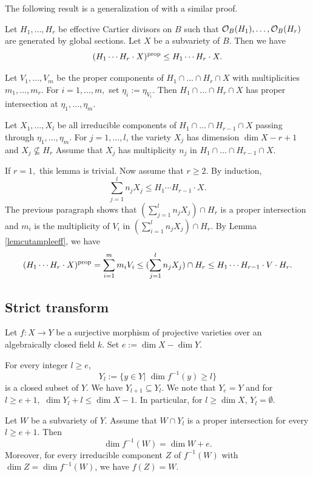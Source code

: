 \documentclass[12pt]{amsart}
\begin{document}
\medskip





The following result is a generalization of \cite[Lemma 3.3]{Jia2021} with a similar proof.

\begin{pro}\label{propropintboundhyp}
Let $H_1, \dots, H_r$ be effective Cartier divisors on $B$ such that 
${\mathcal O}_B(H_1),\dots,{\mathcal O}_B(H_r)$ are generated by global sections. 
Let $X$ be a subvariety of $B$.
Then we have 
$$(H_1\cdots H_r\cdot X)^{{\rm prop}}\leq H_1\cdots H_r\cdot X.$$
\end{pro}

\proof 
Let $V_1,\dots, V_m$ be the proper components of $H_1\cap \dots \cap H_r\cap X$ with multiplicities $m_1,\dots,m_r.$
For $i=1,\dots,m,$ set $\eta_i:=\eta_{V_i}$. Then $H_1\cap \dots \cap H_r\cap X$ has proper intersection at $\eta_1,\dots, \eta_m.$

Let $X_1,\dots, X_l$ be all irreducible components of $H_1\cap\dots\cap H_{r-1}\cap X$ passing through $\eta_1,\dots, \eta_m.$
For  $j=1,\dots,l$, the variety $X_j$ has dimension $\dim X-r+1$ and $X_j\not\subseteq H_r$
Assume that $X_j$ has multiplicity $n_j$ in $H_1\cap\dots\cap H_{r-1}\cap X$.

If $r=1,$ this lemma is trivial.  Now assume that $r\geq 2$. 
By induction,
 $$\sum_{j=1}^l n_jX_j\leq H_1\cdots H_{r-1}\cdot X.$$
The previous paragraph shows that $(\sum_{j=1}^l n_jX_j)\cap H_r$ is a proper intersection and $m_i$ is the multiplicity of $V_i$ in $(\sum_{i=1}^l n_jX_j)\cap H_r.$
By Lemma \ref{lemcutampleeff}, we have 
$$(H_1\cdots H_r\cdot X)^{{\rm prop}}=\sum_{i=1}^m m_iV_i\leq (\sum_{j=1}^l n_jX_j)\cap H_r\leq H_1\cdots H_{r-1}\cdot V\cdot H_r.$$
\endproof


\subsection{Strict transform}
Let $f:X\to Y$ be a surjective morphism of projective varieties over an algebraically closed field $k.$ 
Set $e:=\dim X-\dim Y$.

For every integer $l\geq e$,   
$$Y_l:=\{y\in Y|\,\, \dim f^{-1}(y)\geq l\}$$ 
is a closed subset of $Y$. 
We have $Y_{l+1}\subseteq Y_l$.
We note that $Y_{e}=Y$ and for $l\geq e+1,$
$\dim Y_l+l\leq \dim X-1$. In particular, for $l\geq \dim X$, $Y_l=\emptyset.$


\begin{lem}\label{lempullbackproper}
Let $W$ be a subvariety of $Y$. 
Assume that $W\cap Y_l$ is a proper intersection for every $l\geq e+1$.
Then 
$$\dim f^{-1}(W)=\dim W+e.$$
Moreover, for every irreducible component $Z$ of $f^{-1}(W)$ with $\dim Z=\dim f^{-1}(W)$, we have $f(Z)=W.$
\end{lem}
\end{document}

